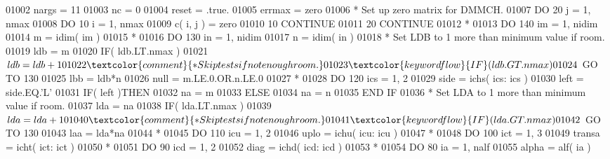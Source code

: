 \begin{DoxyCode}
01002       nargs = 11
01003       nc = 0
01004       reset = .true.
01005       errmax = zero
01006 \textcolor{comment}{*     Set up zero matrix for DMMCH.}
01007       \textcolor{keywordflow}{DO} 20 j = 1, nmax
01008          \textcolor{keywordflow}{DO} 10 i = 1, nmax
01009             c( i, j ) = zero
01010    10    \textcolor{keywordflow}{CONTINUE}
01011    20 \textcolor{keywordflow}{CONTINUE}
01012 \textcolor{comment}{*}
01013       \textcolor{keywordflow}{DO} 140 im = 1, nidim
01014          m = idim( im )
01015 \textcolor{comment}{*}
01016          \textcolor{keywordflow}{DO} 130 in = 1, nidim
01017             n = idim( in )
01018 \textcolor{comment}{*           Set LDB to 1 more than minimum value if room.}
01019             ldb = m
01020             \textcolor{keywordflow}{IF}( ldb.LT.nmax )
01021      $         ldb = ldb + 1
01022 \textcolor{comment}{*           Skip tests if not enough room.}
01023             \textcolor{keywordflow}{IF}( ldb.GT.nmax )
01024      $         \textcolor{keywordflow}{GO TO} 130
01025             lbb = ldb*n
01026             null = m.LE.0.OR.n.LE.0
01027 \textcolor{comment}{*}
01028             \textcolor{keywordflow}{DO} 120 ics = 1, 2
01029                side = ichs( ics: ics )
01030                left = side.EQ.\textcolor{stringliteral}{'L'}
01031                \textcolor{keywordflow}{IF}( left )\textcolor{keywordflow}{THEN}
01032                   na = m
01033                \textcolor{keywordflow}{ELSE}
01034                   na = n
01035 \textcolor{keywordflow}{               END IF}
01036 \textcolor{comment}{*              Set LDA to 1 more than minimum value if room.}
01037                lda = na
01038                \textcolor{keywordflow}{IF}( lda.LT.nmax )
01039      $            lda = lda + 1
01040 \textcolor{comment}{*              Skip tests if not enough room.}
01041                \textcolor{keywordflow}{IF}( lda.GT.nmax )
01042      $            \textcolor{keywordflow}{GO TO} 130
01043                laa = lda*na
01044 \textcolor{comment}{*}
01045                \textcolor{keywordflow}{DO} 110 icu = 1, 2
01046                   uplo = ichu( icu: icu )
01047 \textcolor{comment}{*}
01048                   \textcolor{keywordflow}{DO} 100 ict = 1, 3
01049                      transa = icht( ict: ict )
01050 \textcolor{comment}{*}
01051                      \textcolor{keywordflow}{DO} 90 icd = 1, 2
01052                         diag = ichd( icd: icd )
01053 \textcolor{comment}{*}
01054                         \textcolor{keywordflow}{DO} 80 ia = 1, nalf
01055                            alpha = alf( ia )

\end{DoxyCode}
